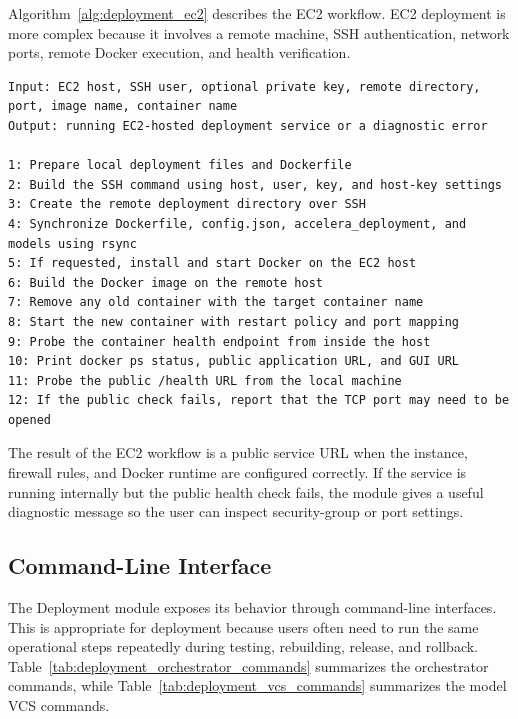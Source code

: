 Algorithm~\ref{alg:deployment_ec2} describes the EC2 workflow. EC2 deployment
is more complex because it involves a remote machine, SSH authentication,
network ports, remote Docker execution, and health verification.

\newpage
\begin{lstlisting}[style=algostyle,caption={Deploying the model service to AWS EC2},label={alg:deployment_ec2}]
Input: EC2 host, SSH user, optional private key, remote directory, port, image name, container name
Output: running EC2-hosted deployment service or a diagnostic error

1: Prepare local deployment files and Dockerfile
2: Build the SSH command using host, user, key, and host-key settings
3: Create the remote deployment directory over SSH
4: Synchronize Dockerfile, config.json, accelera_deployment, and models using rsync
5: If requested, install and start Docker on the EC2 host
6: Build the Docker image on the remote host
7: Remove any old container with the target container name
8: Start the new container with restart policy and port mapping
9: Probe the container health endpoint from inside the host
10: Print docker ps status, public application URL, and GUI URL
11: Probe the public /health URL from the local machine
12: If the public check fails, report that the TCP port may need to be opened
\end{lstlisting}

The result of the EC2 workflow is a public service URL when the instance,
firewall rules, and Docker runtime are configured correctly. If the service is
running internally but the public health check fails, the module gives a useful
diagnostic message so the user can inspect security-group or port settings.

\subsection{Command-Line Interface}
\noindent The Deployment module exposes its behavior through command-line
interfaces. This is appropriate for deployment because users often need to run
the same operational steps repeatedly during testing, rebuilding, release, and
rollback. Table~\ref{tab:deployment_orchestrator_commands} summarizes the
orchestrator commands, while Table~\ref{tab:deployment_vcs_commands} summarizes
the model VCS commands.


